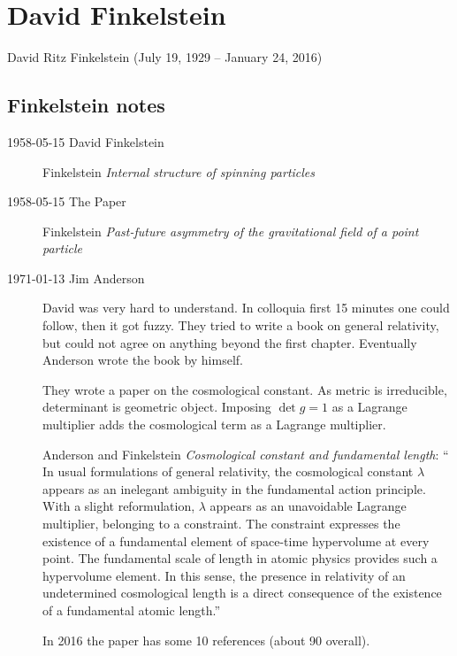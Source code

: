 
\chapter{David Finkelstein}
\label{c-Finkelstein}

David Ritz Finkelstein (July 19, 1929 -- January 24, 2016)



\section{Finkelstein notes}
\label{sect:Finkelstein}

\begin{description}
\item[1958-05-15 David Finkelstein]

Finkelstein
{\em Internal structure of spinning particles}

\item[1958-05-15 The Paper]
Finkelstein
{\em Past-future asymmetry of the gravitational field of a point particle}

\item[1971-01-13 Jim Anderson] David was very hard to understand. In
colloquia first 15 minutes one could follow, then it got fuzzy. They
tried to write a book on general relativity, but could not agree on
anything beyond the first chapter. Eventually Anderson wrote the book by
himself.

They wrote a paper on the cosmological constant. As metric is irreducible,
determinant is geometric object. Imposing $\det g = 1$ as a Lagrange
multiplier adds the cosmological term as a Lagrange multiplier.

Anderson and Finkelstein
{\em Cosmological constant and fundamental length}: ``
In usual formulations of general relativity, the cosmological constant
$\lambda$
appears as an inelegant ambiguity in the fundamental action principle.
With a slight reformulation, $\lambda$ appears as an unavoidable Lagrange
multiplier, belonging to a constraint. The constraint expresses the
existence of a fundamental element of space-time hypervolume at every
point. The fundamental scale of length in atomic physics provides such a
hypervolume element. In this sense, the presence in relativity of an
undetermined cosmological length is a direct consequence of the existence
of a fundamental atomic length.''

In 2016 the paper has some 10 references (about 90 overall).


\end{description}
